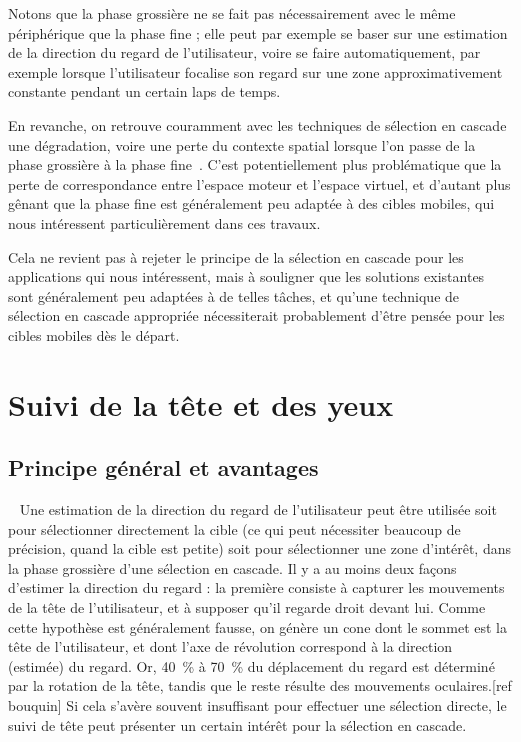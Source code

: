 	Notons que la phase grossière ne se fait pas nécessairement avec le même périphérique que la phase fine ; elle peut par exemple se baser sur une estimation de la direction du regard de l'utilisateur, voire se faire automatiquement, par exemple lorsque l'utilisateur focalise son regard sur une zone approximativement constante pendant un certain laps de temps.
	
	En revanche, on retrouve couramment avec les techniques de sélection en cascade une dégradation, voire une perte du contexte spatial lorsque l'on passe de la phase grossière à la phase fine~\cite{kopper2011rapid, debarba2013disambiguation}. C'est potentiellement plus problématique que la perte de correspondance entre l'espace moteur et l'espace virtuel, et d'autant plus gênant que la phase fine est généralement peu adaptée à des cibles mobiles, qui nous intéressent particulièrement dans ces travaux.
	
	Cela ne revient pas à rejeter le principe de la sélection en cascade pour les applications qui nous intéressent, mais à souligner que les solutions existantes sont généralement peu adaptées à de telles tâches, et qu'une technique de sélection en cascade appropriée nécessiterait probablement d'être pensée pour les cibles mobiles dès le départ.


\section{Suivi de la tête et des yeux}
	\subsection{Principe général et avantages}
	~\cite{zhai1999manual}
	Une estimation de la direction du regard de l'utilisateur peut être utilisée soit pour sélectionner directement la cible (ce qui peut nécessiter beaucoup de précision, quand la cible est petite) soit pour sélectionner une zone d'intérêt, dans la phase grossière d'une sélection en cascade. Il y a au moins deux façons d'estimer la direction du regard : la première consiste à capturer les mouvements de la tête de l'utilisateur, et à supposer qu'il regarde droit devant lui. Comme cette hypothèse est généralement fausse, on génère un cone dont le sommet est la tête de l'utilisateur, et dont l'axe de révolution correspond à la direction (estimée) du regard. Or, 40~\%{} à 70~\%{} du déplacement du regard est déterminé par la rotation de la tête, tandis que le reste résulte des mouvements oculaires.[ref bouquin] Si cela s'avère souvent insuffisant pour effectuer une sélection directe, le suivi de tête peut présenter un certain intérêt pour la sélection en cascade.
		

